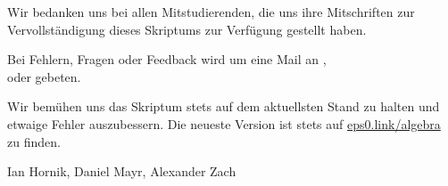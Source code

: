 
Wir bedanken uns bei allen Mitstudierenden, die uns ihre Mitschriften zur Vervollständigung dieses Skriptums zur Verfügung gestellt haben.

Bei Fehlern, Fragen oder Feedback wird um eine Mail an , \\  oder  gebeten.

Wir bemühen uns das Skriptum stets auf dem aktuellsten Stand zu halten und etwaige Fehler auszubessern. Die neueste Version ist stets auf \href{https://eps0.link/algebra}{\ttfamily eps0.link/algebra} zu finden.

\begin{flushright}
    Ian Hornik, Daniel Mayr, Alexander Zach
\end{flushright}